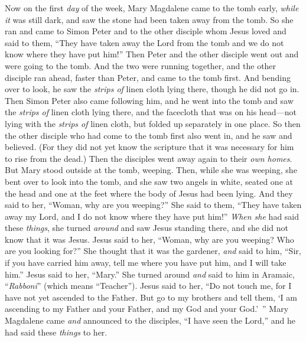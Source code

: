 \begin{biblechapter} %
 Now on the first \textit{day} of the week, Mary Magdalene came to the tomb early, \textit{while it} was still dark, and saw the stone had been taken away from the tomb.
\verse So she ran and came to Simon Peter and to the other disciple whom Jesus loved and said to them, “They have taken away the Lord from the tomb and we do not know where they have put him!”
\verse Then Peter and the other disciple went out and were going to the tomb.
\verse And the two were running together, and the other disciple ran ahead, faster than Peter, and came to the tomb first.
\verse And bending over to look, he saw the \textit{strips of} linen cloth lying there, though he did not go in.
\verse Then Simon Peter also came following him, and he went into the tomb and saw the \textit{strips of} linen cloth lying there,
\verse and the facecloth that was on his head—not lying with the \textit{strips of} linen cloth, but folded up separately in one place.
\verse So then the other disciple who had come to the tomb first also went in, and he saw and believed.
\verse (For they did not yet know the scripture that it was necessary for him to rise from the dead.)
 Then the disciples went away again to their \textit{own homes}.
\verse But Mary stood outside at the tomb, weeping. Then, while she was weeping, she bent over to look into the tomb,
\verse and she saw two angels in white, seated one at the head and one at the feet where the body of Jesus had been lying.
\verse And they said to her, “Woman, why are you weeping?” She said to them, “They have taken away my Lord, and I do not know where they have put him!”
\verse \textit{When she} had said these \textit{things}, she turned \textit{around} and saw Jesus standing there, and she did not know that it was Jesus.
\verse Jesus said to her, “Woman, why are you weeping? Who are you looking for?” She thought that it was the gardener, \textit{and} said to him, “Sir, if you have carried him away, tell me where you have put him, and I will take him.”
\verse Jesus said to her, “Mary.” She turned around \textit{and} said to him in Aramaic, “\textit{Rabboni}” (which means “Teacher”).
\verse Jesus said to her, “Do not touch me, for I have not yet ascended to the Father. But go to my brothers and tell them, ‘I am ascending to my Father and your Father, and my God and your God.’ ”
\verse Mary Magdalene came \textit{and} announced to the disciples, “I have seen the Lord,” and he had said these \textit{things} to her.

\end{biblechapter}
